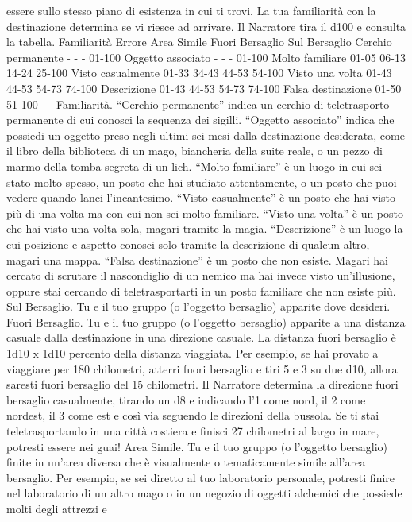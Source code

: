 \begin{multicols}{2}
essere sullo stesso piano di esistenza in cui ti trovi. La
tua familiarità con la destinazione determina se vi riesce
ad arrivare. Il Narratore tira il d100 e consulta la tabella.
Familiarità Errore Area
Simile
Fuori
Bersaglio
Sul
Bersaglio
Cerchio
permanente
- - - 01-100
Oggetto
associato
- - - 01-100
Molto
familiare
01-05 06-13 14-24 25-100
Visto
casualmente
01-33 34-43 44-53 54-100
Visto una
volta
01-43 44-53 54-73 74-100
Descrizione 01-43 44-53 54-73 74-100
Falsa
destinazione
01-50 51-100 - -
Familiarità. “Cerchio permanente” indica un cerchio di
teletrasporto permanente di cui conosci la sequenza dei
sigilli. “Oggetto associato” indica che possiedi un
oggetto preso negli ultimi sei mesi dalla destinazione
desiderata, come il libro della biblioteca di un mago,
biancheria della suite reale, o un pezzo di marmo della
tomba segreta di un lich.
“Molto familiare” è un luogo in cui sei stato molto
spesso, un posto che hai studiato attentamente, o un
posto che puoi vedere quando lanci l’incantesimo.
“Visto casualmente” è un posto che hai visto più di una
volta ma con cui non sei molto familiare. “Visto una
volta” è un posto che hai visto una volta sola, magari
tramite la magia. “Descrizione” è un luogo la cui
posizione e aspetto conosci solo tramite la descrizione
di qualcun altro, magari una mappa.
“Falsa destinazione” è un posto che non esiste. Magari
hai cercato di scrutare il nascondiglio di un nemico ma
hai invece visto un’illusione, oppure stai cercando di
teletrasportarti in un posto familiare che non esiste più.
Sul Bersaglio. Tu e il tuo gruppo (o l’oggetto bersaglio)
apparite dove desideri.
Fuori Bersaglio. Tu e il tuo gruppo (o l’oggetto
bersaglio) apparite a una distanza casuale dalla
destinazione in una direzione casuale. La distanza fuori
bersaglio è 1d10 x 1d10 percento della distanza
viaggiata. Per esempio, se hai provato a viaggiare per
180 chilometri, atterri fuori bersaglio e tiri 5 e 3 su due
d10, allora saresti fuori bersaglio del 15%
chilometri. Il Narratore determina la direzione fuori bersaglio
casualmente, tirando un d8 e indicando l’1 come nord, il
2 come nordest, il 3 come est e così via seguendo le
direzioni della bussola. Se ti stai teletrasportando in una
città costiera e finisci 27 chilometri al largo in mare,
potresti essere nei guai!
Area Simile. Tu e il tuo gruppo (o l’oggetto bersaglio)
finite in un’area diversa che è visualmente o
tematicamente simile all’area bersaglio. Per esempio,
se sei diretto al tuo laboratorio personale, potresti finire
nel laboratorio di un altro mago o in un negozio di
oggetti alchemici che possiede molti degli attrezzi e

\end{multicols}
